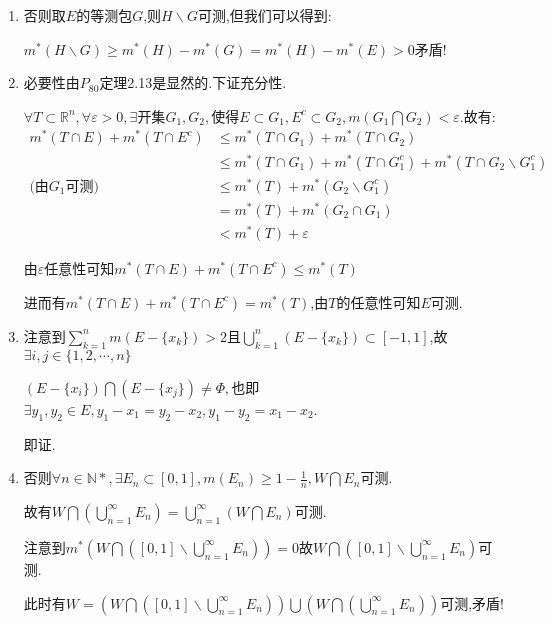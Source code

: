 \documentclass[UTF8, a4paper, 12pt, oneside, onecolumn]{article}
\numberwithin{equation}{section}
\numberwithin{figure}{section}
\numberwithin{table}{section}
\theoremstyle{nonumberplain}	%
\theoremstyle{plain}	%
\theoremstyle{plain}	%
\theoremstyle{plain}	%
\theoremstyle{plain}	%
\theoremstyle{nonumberplain}
\begin{document}
\begin{enumerate}
	\item 否则取$E$的等测包$G$,则$H\backslash G$可测,但我们可以得到:
	
	$m^*(H\backslash G)\geqslant m^*(H)-m^*(G)=m^*(H)-m^*(E)>0$矛盾!
	\item 必要性由$P_{80}$定理2.13是显然的.下证充分性.
	
	$\forall T\subset \mathbb{R}^n,\forall \varepsilon>0,\exists $开集$G_1,G_2,$使得$E\subset G_1,E^c\subset G_2,m(G_1\bigcap G_2)<\varepsilon.$故有:
	\begin{align*}
	m^*(T\cap E)+m^*(T\cap E^c)&\leqslant m^*(T\cap G_1)+m^*(T\cap G_2)\\
	&\leqslant m^*(T\cap G_1)+m^*(T\cap G_1^c)+m^*(T\cap G_2\backslash G_1^c)\\
	\text{(由$G_1$可测)}&\leqslant m^*(T)+m^*(G_2\backslash G_1^c)\\
	&= m^*(T)+m^*(G_2\cap G_1)\\
	&< m^*(T)+\varepsilon
	\end{align*}
	
	由$\varepsilon$任意性可知$m^*(T\cap E)+m^*(T\cap E^c)\leqslant m^*(T)$
	
	进而有$m^*(T\cap E)+m^*(T\cap E^c)= m^*(T)$,由$T$的任意性可知$E$可测.
	
	\item 注意到$\displaystyle\sum_{k=1}^{n}m(E-\{x_k\})>2$且$\displaystyle\bigcup_{k=1}^{n}(E-\{x_k\})\subset [-1,1]$,故$\exists i,j\in \{1,2,\cdots,n\}$
	
	$(E-\{x_i\})\bigcap(E-\{x_j\})\neq\Phi,$也即$\exists y_1,y_2\in E,y_1-x_1=y_2-x_2,y_1-y_2=x_1-x_2$.
	
	即证.
	
	\item 否则$\displaystyle\forall n\in \mathbb{N*},\exists E_n\subset [0,1],m(E_n)\geqslant 1-\frac{1}{n},W\bigcap E_n$可测.
	
	故有$\displaystyle W\bigcap(\bigcup_{n=1}^{\infty}E_n)=\bigcup_{n=1}^{\infty}(W\bigcap E_n)$可测.
	
	注意到$\displaystyle m^*(W\bigcap([0,1]\backslash \bigcup_{n=1}^{\infty}E_n))=0$故$\displaystyle W\bigcap([0,1]\backslash \bigcup_{n=1}^{\infty}E_n)$可测.
	
	此时有$\displaystyle W=\left(W\bigcap([0,1]\backslash \bigcup_{n=1}^{\infty}E_n)\right)\bigcup\left(W\bigcap(\bigcup_{n=1}^{\infty}E_n)\right)$可测,矛盾!
	
\end{enumerate}	
\end{document}
